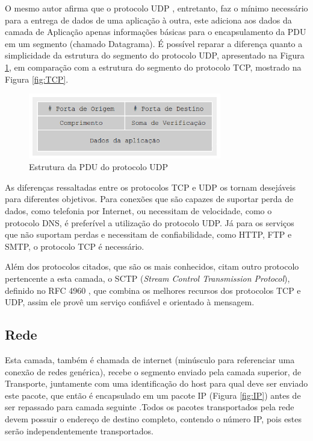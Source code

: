 O mesmo autor afirma que o protocolo UDP \cite{RFC768}, entretanto, faz o mínimo necessário para a entrega de dados de uma aplicação à outra, este adiciona aos dados da camada de Aplicação apenas informações básicas para o encapsulamento da PDU em um segmento (chamado Datagrama). É possível reparar a diferença quanto a simplicidade da estrutura do segmento do protocolo UDP, apresentado na Figura \ref{fig:UDP}, em comparação com a estrutura do segmento do protocolo TCP, mostrado na Figura \ref{fig:TCP}.

\begin{figure}
	\centering
    \includegraphics[width=0.75\textwidth]{04-figuras/UDP.png}
    \caption{Estrutura da PDU do protocolo UDP}
    \label{fig:UDP}
\end{figure}

As diferenças ressaltadas entre os protocolos TCP e UDP os tornam desejáveis para diferentes objetivos. Para conexões que são capazes de suportar perda de dados, como telefonia por Internet, ou necessitam de velocidade, como o protocolo DNS, é preferível a utilização do protocolo UDP. Já para os serviços que não suportam perdas e necessitam de confiabilidade, como HTTP, FTP e SMTP, o protocolo TCP é necessário.

Além dos protocolos citados, que são os mais conhecidos,  citam outro protocolo pertencente a esta camada, o SCTP (\textit{Stream Control Transmission Protocol}), definido no RFC 4960 \cite{RFC4960}, que combina os melhores recursos dos protocolos TCP e UDP, assim ele provê um serviço confiável e orientado à mensagem.


\subsection{Rede}

Esta camada, também é chamada de internet (minúsculo para referenciar uma conexão de redes genérica), recebe o segmento enviado pela camada superior, de Transporte, juntamente com uma identificação do host para qual deve ser enviado este pacote, que então é encapsulado em um pacote IP (Figura \ref{fig:IP}) antes de ser repassado para camada seguinte \cite{COMER}.Todos os pacotes transportados pela rede devem possuir o endereço de destino completo, contendo o número IP, pois estes serão independentemente transportados. 

